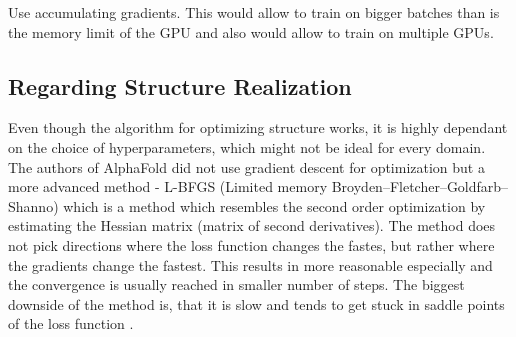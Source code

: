 Use accumulating gradients. This would allow to train on bigger batches than is the memory limit of the GPU and also would allow to train on multiple GPUs.

\subsection{Regarding Structure Realization}

Even though the algorithm for optimizing structure works, it is highly dependant on the choice of hyperparameters, which might not be ideal for every domain. The authors of AlphaFold did not use gradient descent for optimization but a more advanced method - L-BFGS (Limited memory Broyden–Fletcher–Goldfarb–Shanno) which is a method which resembles the second order optimization by estimating the Hessian matrix (matrix of second derivatives). The method does not pick directions where the loss function changes the fastes, but rather where the gradients change the fastest. This results in more reasonable especially and the convergence is usually reached in smaller number of steps. The biggest downside of the method is, that it is slow and tends to get stuck in saddle points of the loss function \cite{nn_dl}.